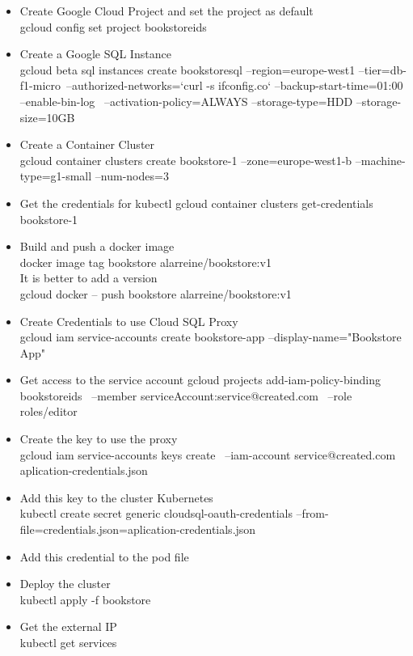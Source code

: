\documentclass[a4paper]{article}
\begin{document}
\begin{itemize}
    \item Create Google Cloud Project and set the project as default\\
    gcloud config set project bookstoreids
    \item Create a Google SQL Instance\\
    gcloud beta sql instances create bookstoresql --region=europe-west1 --tier=db-f1-micro\
 --authorized-networks=`curl -s ifconfig.co` --backup-start-time=01:00 --enable-bin-log \
 --activation-policy=ALWAYS --storage-type=HDD --storage-size=10GB
    \item Create a Container Cluster\\
    gcloud container clusters create bookstore-1 --zone=europe-west1-b --machine-type=g1-small --num-nodes=3
    \item Get the credentials for kubectl
    gcloud container clusters get-credentials bookstore-1
    \item Build and push a docker image \\ 
    docker image tag bookstore alarreine/bookstore:v1 \\
    It is better to add a version\\
    gcloud docker -- push bookstore alarreine/bookstore:v1
    \item Create Credentials to use Cloud SQL Proxy\\
    gcloud iam service-accounts create bookstore-app --display-name="Bookstore App"
    \item Get access to the service account
    gcloud projects add-iam-policy-binding bookstoreids \
 --member serviceAccount:service@created.com \
 --role roles/editor
 \item Create the key to use the proxy\\
 gcloud iam service-accounts keys create \
--iam-account service@created.com aplication-credentials.json
 \item Add this key to the cluster Kubernetes\\
 kubectl create secret generic cloudsql-oauth-credentials --from-file=credentials.json=aplication-credentials.json
 \item Add this credential to the pod file \cite{containersql}
\item Deploy the cluster \\
kubectl apply -f bookstore
\item Get the external IP \\
kubectl get services
 
\end{itemize}
\end{document}
